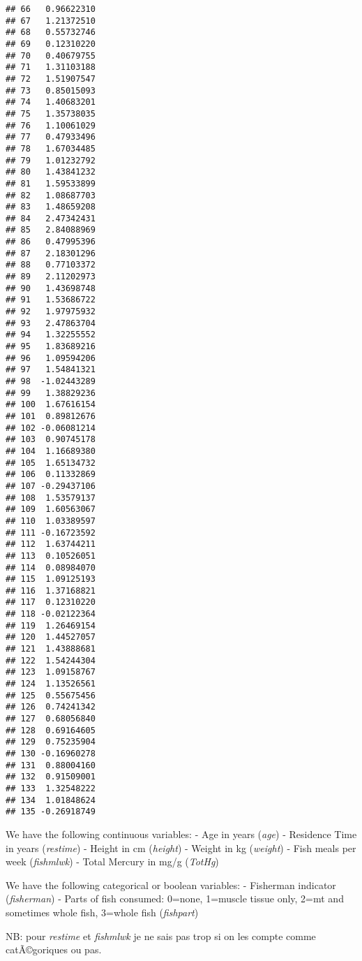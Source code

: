 \documentclass[12pt,]{article}
\newenvironment{Shaded}{\begin{snugshade}}{\end{snugshade}}
\newcommand{\KeywordTok}[1]{\textcolor[rgb]{0.13,0.29,0.53}{\textbf{#1}}}
\newcommand{\StringTok}[1]{\textcolor[rgb]{0.31,0.60,0.02}{#1}}
\newcommand{\CommentTok}[1]{\textcolor[rgb]{0.56,0.35,0.01}{\textit{#1}}}
\newcommand{\OperatorTok}[1]{\textcolor[rgb]{0.81,0.36,0.00}{\textbf{#1}}}
\newcommand{\NormalTok}[1]{#1}
\begin{document}
\begin{verbatim}
## 66   0.96622310
## 67   1.21372510
## 68   0.55732746
## 69   0.12310220
## 70   0.40679755
## 71   1.31103188
## 72   1.51907547
## 73   0.85015093
## 74   1.40683201
## 75   1.35738035
## 76   1.10061029
## 77   0.47933496
## 78   1.67034485
## 79   1.01232792
## 80   1.43841232
## 81   1.59533899
## 82   1.08687703
## 83   1.48659208
## 84   2.47342431
## 85   2.84088969
## 86   0.47995396
## 87   2.18301296
## 88   0.77103372
## 89   2.11202973
## 90   1.43698748
## 91   1.53686722
## 92   1.97975932
## 93   2.47863704
## 94   1.32255552
## 95   1.83689216
## 96   1.09594206
## 97   1.54841321
## 98  -1.02443289
## 99   1.38829236
## 100  1.67616154
## 101  0.89812676
## 102 -0.06081214
## 103  0.90745178
## 104  1.16689380
## 105  1.65134732
## 106  0.11332869
## 107 -0.29437106
## 108  1.53579137
## 109  1.60563067
## 110  1.03389597
## 111 -0.16723592
## 112  1.63744211
## 113  0.10526051
## 114  0.08984070
## 115  1.09125193
## 116  1.37168821
## 117  0.12310220
## 118 -0.02122364
## 119  1.26469154
## 120  1.44527057
## 121  1.43888681
## 122  1.54244304
## 123  1.09158767
## 124  1.13526561
## 125  0.55675456
## 126  0.74241342
## 127  0.68056840
## 128  0.69164605
## 129  0.75235904
## 130 -0.16960278
## 131  0.88004160
## 132  0.91509001
## 133  1.32548222
## 134  1.01848624
## 135 -0.26918749
\end{verbatim}

We have the following continuous variables: - Age in years (\emph{age})
- Residence Time in years (\emph{restime}) - Height in cm
(\emph{height}) - Weight in kg (\emph{weight}) - Fish meals per week
(\emph{fishmlwk}) - Total Mercury in mg/g (\emph{TotHg})

We have the following categorical or boolean variables: - Fisherman
indicator (\emph{fisherman}) - Parts of fish consumed: 0=none, 1=muscle
tissue only, 2=mt and sometimes whole fish, 3=whole fish
(\emph{fishpart})

NB: pour \emph{restime} et \emph{fishmlwk} je ne sais pas trop si on les
compte comme catÃ©goriques ou pas.

\begin{Shaded}
\end{Shaded}
\end{document}
